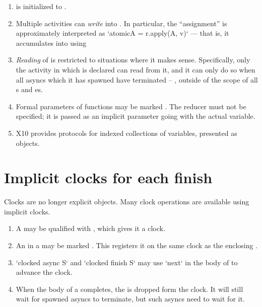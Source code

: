\begin{enumerate}
\item {} is initialized to .  
\item Multiple activities can {\em write} into .  In particular, the
      ``assignment''  is approximately interpreted as 
      \xcd`atomic{A = r.apply(A, v)}` --- that is, it accumulates  into
       using 
\item {\em Reading} of  is restricted to situations where it makes
      sense.  Specifically, only the activity in which  is declared can
      read from it, and it can only do so when all asyncs which it has spawned
      have terminated -- \eg, outside of the scope of all s and
      es.  
\item Formal parameters of functions may be marked .  The reducer
       must not be specified; it is passed as an implicit parameter
      going with the actual  variable.  
\item X10 provides protocols for indexed collections of  variables,
      presented as objects.
\end{enumerate}



\section{Implicit clocks for each finish}


Clocks are no longer explicit objects.  Many clock operations are available
using implicit clocks.

\begin{enumerate}
\item A  may be qualified with , which gives it a
      clock.
\item An  in a  may be marked .
      This registers it on the same clock as the enclosing .  
\item \xcd`clocked async S` and \xcd`clocked finish S` may use \xcd`next` in
      the body of  to advance the clock.
\item When the body of a  completes, the  is dropped form the clock.  It will still wait for spawned
      asyncs to terminate, but such asyncs need to wait for it.
\end{enumerate}


